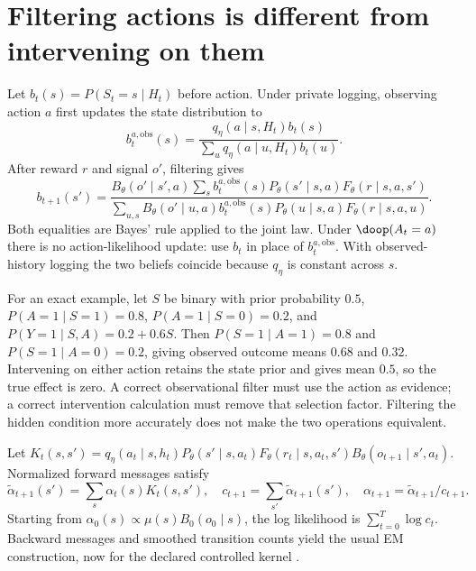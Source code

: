 \section{Filtering actions is different from intervening on them}
\label{r3:filtering}
Let $b_t(s)=P(S_t=s\mid H_t)$ before action. Under private logging,
observing action $a$ first updates the state distribution to
\begin{equation}
 b_t^{a,\mathrm{obs}}(s)
   =\frac{q_\eta(a\mid s,H_t)b_t(s)}
          {\sum_u q_\eta(a\mid u,H_t)b_t(u)}.
 \label{r3:action-update}
\end{equation}
After reward $r$ and signal $o'$, filtering gives
\begin{equation}
 b_{t+1}(s')=
 \frac{B_\theta(o'\mid s',a)
       \sum_s b_t^{a,\mathrm{obs}}(s)P_\theta(s'\mid s,a)
                                    F_\theta(r\mid s,a,s')}
      {\sum_{u,s}B_\theta(o'\mid u,a)b_t^{a,\mathrm{obs}}(s)
            P_\theta(u\mid s,a)F_\theta(r\mid s,a,u)}.
 \label{r3:controlled-filter}
\end{equation}
Both equalities are Bayes' rule applied to the joint law. Under
$\doop(A_t=a)$ there is no action-likelihood update: use $b_t$ in
place of $b_t^{a,\mathrm{obs}}$. With observed-history logging the two
beliefs coincide because $q_\eta$ is constant across $s$.

For an exact example, let $S$ be binary with prior probability $0.5$,
$P(A=1\mid S=1)=0.8$, $P(A=1\mid S=0)=0.2$, and
$P(Y=1\mid S,A)=0.2+0.6S$. Then $P(S=1\mid A=1)=0.8$ and
$P(S=1\mid A=0)=0.2$, giving observed outcome means $0.68$ and
$0.32$. Intervening on either action retains the state prior and gives
mean $0.5$, so the true effect is zero. A correct observational filter
must use the action as evidence; a correct intervention calculation
must remove that selection factor. Filtering the hidden condition more
accurately does not make the two operations equivalent.

Let
$K_t(s,s')=q_\eta(a_t\mid s,h_t)P_\theta(s'\mid s,a_t)
F_\theta(r_t\mid s,a_t,s')B_\theta(o_{t+1}\mid s',a_t)$.
Normalized forward messages satisfy
\[
 \widetilde\alpha_{t+1}(s')=\sum_s\alpha_t(s)K_t(s,s'),\quad
 c_{t+1}=\sum_{s'}\widetilde\alpha_{t+1}(s'),\quad
 \alpha_{t+1}=\widetilde\alpha_{t+1}/c_{t+1}.
\]
Starting from $\alpha_0(s)\propto\mu(s)B_0(o_0\mid s)$, the
log likelihood is $\sum_{t=0}^T\log c_t$. Backward messages and
smoothed transition counts yield the usual EM construction, now for
the declared controlled kernel \citep{rabiner1989}.

